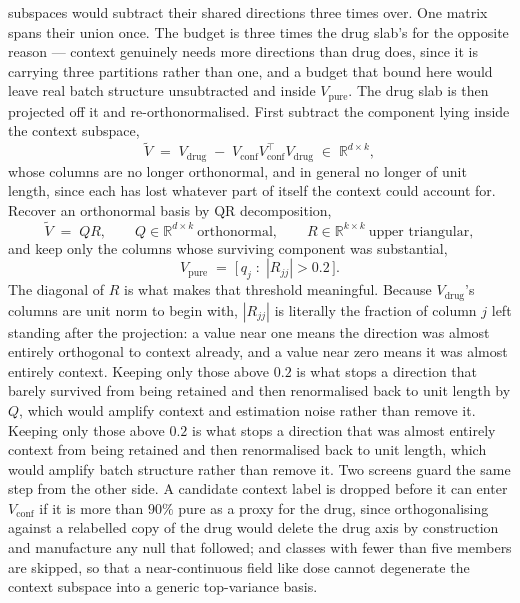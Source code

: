 subspaces would subtract their shared directions three times over. One matrix
spans their union once. The budget is three times the drug slab's for the
opposite reason --- context genuinely needs more directions than drug does,
since it is carrying three partitions rather than one, and a budget that bound
here would leave real batch structure unsubtracted and inside
$V_{\textrm{pure}}$.
The drug slab is then projected off it and re-orthonormalised. First subtract
the component lying inside the context subspace,
\begin{equation}
  \widetilde{V} \;=\; V_{\textrm{drug}} \;-\;
    V_{\textrm{conf}} V_{\textrm{conf}}^{\top} V_{\textrm{drug}}
  \;\in\; \mathbb{R}^{d \times k},
\end{equation}
whose columns are no longer orthonormal, and in general no longer of unit
length, since each has lost whatever part of itself the context could account
for. Recover an orthonormal basis by QR decomposition,
\begin{equation}
  \widetilde{V} \;=\; QR ,
  \qquad
  Q \in \mathbb{R}^{d \times k} \ \textrm{orthonormal},
  \qquad
  R \in \mathbb{R}^{k \times k} \ \textrm{upper triangular},
\end{equation}
and keep only the columns whose surviving component was substantial,
\begin{equation}
  V_{\textrm{pure}} \;=\; \big[\, q_j \;:\; |R_{jj}| > 0.2 \,\big].
\end{equation}
The diagonal of $R$ is what makes that threshold meaningful. Because
$V_{\textrm{drug}}$'s columns are unit norm to begin with, $|R_{jj}|$ is
literally the fraction of column $j$ left standing after the projection: a
value near one means the direction was almost entirely orthogonal to context
already, and a value near zero means it was almost entirely context. Keeping
only those above $0.2$ is what stops a direction that barely survived from
being retained and then renormalised back to unit length by $Q$, which would
amplify context and estimation noise rather than remove it. Keeping only those above $0.2$ is what stops
a direction that was almost entirely context from being retained and then
renormalised back to unit length, which would amplify batch structure rather
than remove it. Two screens guard the same step from the other side. A
candidate context label is dropped before it can enter $V_{\textrm{conf}}$ if
it is more than $90\%$ pure as a proxy for the drug, since orthogonalising
against a relabelled copy of the drug would delete the drug axis by
construction and manufacture any null that followed; and classes with fewer
than five members are skipped, so that a near-continuous field like dose cannot
degenerate the context subspace into a generic top-variance basis.

